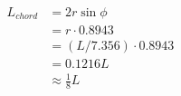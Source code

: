 \documentclass[12pt]{article}
\begin{document}
\begin{align*}
L_{chord} &= 2r\sin\phi \\
          &= r \cdot 0.8943 \\
          &= (L/7.356) \cdot 0.8943 \\
          &= 0.1216 L \\
					&\approx \frac{1}{8} L
\end{align*}
\end{document}
